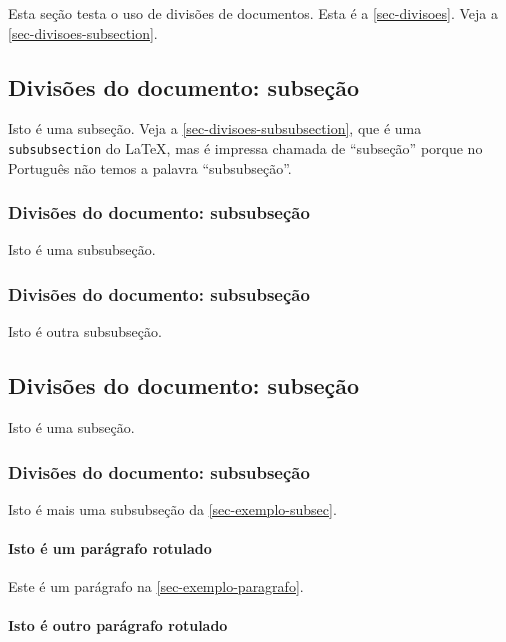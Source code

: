 Esta seção testa o uso de divisões de documentos. Esta é a
\autoref{sec-divisoes}. Veja a \autoref{sec-divisoes-subsection}.

\subsection{Divisões do documento: subseção}\label{sec-divisoes-subsection}

Isto é uma subseção. Veja a \autoref{sec-divisoes-subsubsection}, que é uma
\texttt{subsubsection} do \LaTeX, mas é impressa chamada de ``subseção'' porque
no Português não temos a palavra ``subsubseção''.

\subsubsection{Divisões do documento: subsubseção}
\label{sec-divisoes-subsubsection}

Isto é uma subsubseção.

\subsubsection{Divisões do documento: subsubseção}

Isto é outra subsubseção.

\subsection{Divisões do documento: subseção}\label{sec-exemplo-subsec}

Isto é uma subseção.

\subsubsection{Divisões do documento: subsubseção}

Isto é mais uma subsubseção da \autoref{sec-exemplo-subsec}.


\paragraph{Isto é um parágrafo rotulado}\label{sec-exemplo-paragrafo}

Este é um parágrafo na \autoref{sec-exemplo-paragrafo}. 

\paragraph{Isto é outro parágrafo rotulado}\label{sec-exemplo-paragrafo-outro}


